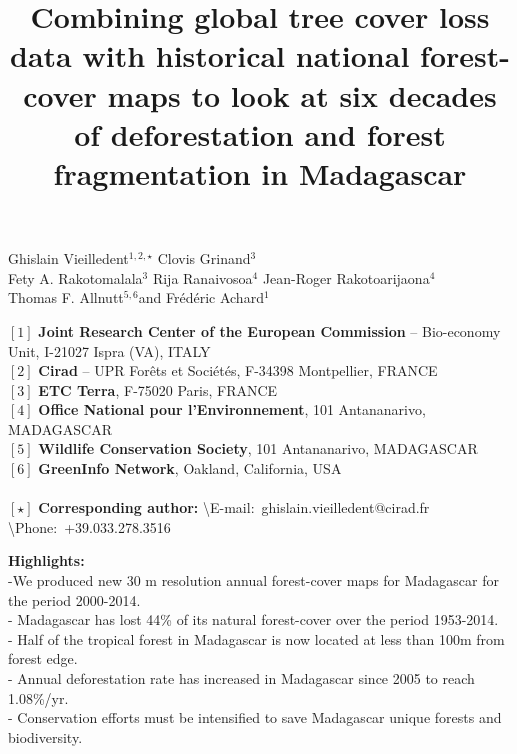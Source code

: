 \documentclass[a4paper, 12pt, leqno]{article} %
\title{Combining global tree cover loss data with historical national
  forest-cover maps to look at six decades of deforestation and forest
  fragmentation in Madagascar}
\date{}
\begin{document}
\maketitle

\vspace{-1cm}
\begin{center}
  Ghislain Vieilledent$^{1,2,\star}$\hspace{1cm}
  Clovis Grinand$^{3}$ \\
  \vspace{0.25cm}
  Fety A. Rakotomalala$^{3}$ \hspace{1cm}
  Rija Ranaivosoa$^{4}$ \hspace{1cm}
  Jean-Roger Rakotoarijaona$^{4}$ \\
  \vspace{0.25cm}
  Thomas F. Allnutt$^{5,6}$\hspace{1cm}and\hspace{1cm}
  Frédéric Achard$^{1}$
\end{center}

\vspace{0.3cm}

{\small
  \begin{flushleft}  
    $[1]$ \textbf{Joint Research Center of the European Commission} -- Bio-economy Unit, I-21027 Ispra (VA), ITALY\\
    $[2]$ \textbf{Cirad} -- UPR Forêts et Sociétés, F-34398 Montpellier, FRANCE\\
    $[3]$ \textbf{ETC Terra}, F-75020 Paris, FRANCE\\
    $[4]$ \textbf{Office National pour l'Environnement}, 101 Antananarivo, MADAGASCAR\\
    $[5]$ \textbf{Wildlife Conservation Society}, 101 Antananarivo, MADAGASCAR\\
    $[6]$ \textbf{GreenInfo Network}, Oakland, California, USA\\
    ~\\
    $[\star]$ \textbf{Corresponding author:}
    \textbackslash{E-mail}:~ghislain.vieilledent@cirad.fr
    \textbackslash{Phone}:~+39.033.278.3516\\
  \end{flushleft}}

\vspace{0.3cm}

{\small
   \begin{flushleft}
   \textbf{Highlights:}\\
    -We produced new 30 m resolution annual forest-cover maps for Madagascar for the period 2000-2014.\\
   - Madagascar has lost 44\% of its natural forest-cover over the period 1953-2014.\\
   - Half of the tropical forest in Madagascar is now located at less than 100m from forest edge.\\
   - Annual deforestation rate has increased in Madagascar since 2005 to reach 1.08\%/yr.\\
   - Conservation efforts must be intensified to save Madagascar unique forests and biodiversity.\\
\end{flushleft}}
\end{document}
